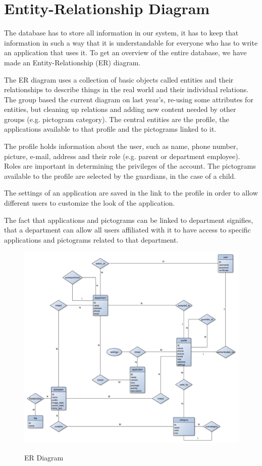 \section{Entity-Relationship Diagram}
The database has to store all information in our system, it has to keep that information in such a way that it is understandable for everyone who has to write an application that uses it. To get an overview of the entire database, we have made an Entity-Relationship (ER) diagram.

The ER diagram uses a collection of basic objects called entities and their relationships to describe things in the real world and their individual relations. The group based the current diagram on last year's, re-using some attributes for entities, but cleaning up relations and adding new content needed by other groups (e.g. pictogram category). The central entities are the profile, the applications available to that profile and the pictograms linked to it.%

The profile holds information about the user, such as name, phone number, picture, e-mail, address and their role (e.g. parent or department employee). Roles are important in determining the privileges of the account. The pictograms available to the profile are selected by the guardians, in the case of a child.

The settings of an application are saved in the link to the profile in order to allow different users to customize the look of the application.

The fact that applications and pictograms can be linked to department signifies, that a department can allow all users affiliated with it to have access to specific applications and pictograms related to that department.

\begin{figure}[h]
\includegraphics[width=\textwidth]{img/ER_diagram.pdf}
\label{fig:erdiagram}
\caption{ER Diagram}
\end{figure}